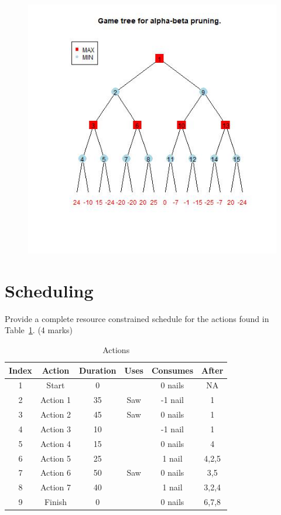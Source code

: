 \documentclass{article}
\begin{document}
\begin{figure}[h!]
\includegraphics[width=\textwidth]{ab.jpg}
\end{figure}
\clearpage
\section{Scheduling}

Provide a complete resource constrained schedule for the actions found in Table~\ref{schActions}. (4 marks)
\begin{table}[h!]
\caption{Actions}
\label{schActions}
\begin{center}
\begin{tabular}{ |c|c|c|c|c|c| } 
\hline
 Index & Action & Duration & Uses & Consumes & After \\
\hline
1 & Start & 0 &   & 0 nails & NA\\
2 & Action 1 & 35 &  Saw & -1 nail & 1\\
3 & Action 2 & 45 &  Saw & 0 nails & 1\\
4 & Action 3 & 10 &   & -1 nail & 1\\
5 & Action 4 & 15 &   & 0 nails & 4\\
6 & Action 5 & 25 &   & 1 nail & 4,2,5\\
7 & Action 6 & 50 &  Saw & 0 nails & 3,5\\
8 & Action 7 & 40 &   & 1 nail & 3,2,4\\
9 & Finish & 0 &   & 0 nails & 6,7,8\\
\hline
\end{tabular}
\end{center}
\end{table}
\clearpage
\end{document}
